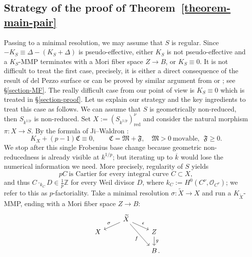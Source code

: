 \documentclass[reqno,oneside]{amsart}
\theoremstyle{definition}
\theoremstyle{plain}
\numberwithin{equation}{section}
\begin{document}
\subsection{Strategy of the proof of Theorem~\ref{theorem-main-pair}}\label{subsection-strategy}
Passing to a minimal resolution, we may assume that $S$ is regular. 
Since $-K_S\equiv \Delta-(K_S+\Delta)$ is pseudo-effective, either $K_S$ is not pseudo-effective and a $K_S$-MMP terminates with a Mori fiber space $Z\to B$, or $K_S\equiv0$.
It is not difficult to treat the first case, precisely, it is either a direct consequence of the result of del Pezzo surface or can be proved by similar argument from \cite{Patakfalvi-Waldron-2022} or \cite{Bernasconi-Tanaka-22}; see \S\ref{section-MF}.
The really difficult case from our point of view is $K_S \equiv 0$ which is treated in \S\ref{section-proof}. Let us explain our strategy and the key ingredients to treat this case as follows. We can assume that $S$ is geometrically non-reduced, then $S_{k^{1/p}}$ is non-reduced. Set $X:=(S_{k^{1/p}})_{\mathrm{red}}^{\nu}$ and consider the natural morphism $\pi\colon X \to S$. By the formula of Ji--Waldron \cite[Theorem~1.1]{ji_structure_2021}:
\begin{equation}\tag{C1}\label{eq:C1}
  K_X + (p-1) \mathfrak{C} \equiv 0,
  \qquad \mathfrak{C}=\mathfrak{M} + \mathfrak{F},\quad
  \mathfrak{M}>0\ \text{movable},\ \ \mathfrak{F}\geq 0.
\end{equation}
We stop after this single Frobenius base change because geometric non-reducedness is already visible at $k^{1/p}$; but iterating up to $\overline k$ would lose the numerical information we need. More precisely, regularity of $S$ yields
\begin{equation}\tag{C2}\label{eq:C2}
  pC\ \text{is Cartier for every integral curve } C\subset X,
\end{equation}
and thus $C\cdot_{k_C} D \in \tfrac1p\mathbb{Z}$ for every Weil divisor $D$, where $k_C := H^0(C^\nu, \mathcal{O}_{C^\nu})$; we refer to this as $p$-factoriality.
Take a minimal resolution $\sigma\colon \widetilde{X}\to X$ and run a $K_{\widetilde{X}}$-MMP, ending with a Mori fiber space $Z\to B$: \[
  \begin{tikzcd}[row sep=tiny]
    &\widetilde{X} \ar[ld,"\sigma"'] \ar[rd,"\epsilon"]\ar[ddddr,"f"'] \\
    X && Z \ar[ddd,"g"] \\ \\ \\
      && B \rlap{\,.}
  \end{tikzcd}
\]
\end{document}
